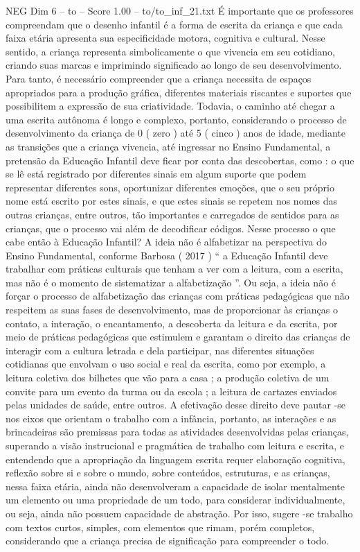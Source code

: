 \begin{textsample}{NEG Dim 6 – to – Score 1.00 – to/to\_inf\_21.txt}
É importante que os professores compreendam que o desenho infantil é a forma de escrita da criança e que cada faixa etária apresenta sua especificidade motora, cognitiva e cultural.
Nesse sentido, a criança representa simbolicamente o que vivencia em seu cotidiano, criando suas marcas e imprimindo significado ao longo de seu desenvolvimento.
Para tanto, é necessário compreender que a criança necessita de espaços apropriados para a produção gráfica, diferentes materiais riscantes e suportes que possibilitem a expressão de sua criatividade.
Todavia, o caminho até chegar a uma escrita autônoma é longo e complexo, portanto, considerando o processo de desenvolvimento da criança de 0 ( zero ) até 5 ( cinco ) anos de idade, mediante as transições que a criança vivencia, até ingressar no Ensino Fundamental, a pretensão da Educação Infantil deve ficar por conta das descobertas, como : o que se lê está registrado por diferentes sinais em algum suporte que podem representar diferentes sons, oportunizar diferentes emoções, que o seu próprio nome está escrito por estes sinais, e que estes sinais se repetem nos nomes das outras crianças, entre outros, tão importantes e carregados de sentidos para as crianças, que o processo vai além de decodificar códigos.
Nesse processo o que cabe então à Educação Infantil?
A ideia não é alfabetizar na perspectiva do Ensino Fundamental, conforme Barbosa ( 2017 ) “ a Educação Infantil deve trabalhar com práticas culturais que tenham a ver com a leitura, com a escrita, mas não é o momento de sistematizar a alfabetização ”.
Ou seja, a ideia não é forçar o processo de alfabetização das crianças com práticas pedagógicas que não respeitem as suas fases de desenvolvimento, mas de proporcionar às crianças o contato, a interação, o encantamento, a descoberta da leitura e da escrita, por meio de práticas pedagógicas que estimulem e garantam o direito das crianças de interagir com a cultura letrada e dela participar, nas diferentes situações cotidianas que envolvam o uso social e real da escrita, como por exemplo, a leitura coletiva dos bilhetes que vão para a casa ; a produção coletiva de um convite para um evento da turma ou da escola ; a leitura de cartazes enviados pelas unidades de saúde, entre outros.
A efetivação desse direito deve pautar -se nos eixos que orientam o trabalho com a infância, portanto, as interações e as brincadeiras são premissas para todas as atividades desenvolvidas pelas crianças, superando a visão instrucional e pragmática de trabalho com leitura e escrita, e entendendo que a apropriação da linguagem escrita requer elaboração cognitiva, reflexão sobre si e sobre o mundo, sobre conteúdos, estruturas, e as crianças, nessa faixa etária, ainda não desenvolveram a capacidade de isolar mentalmente um elemento ou uma propriedade de um todo, para considerar individualmente, ou seja, ainda não possuem capacidade de abstração.
Por isso, sugere -se trabalho com textos curtos, simples, com elementos que rimam, porém completos, considerando que a criança precisa de significação para compreender o todo.

\end{textsample}
